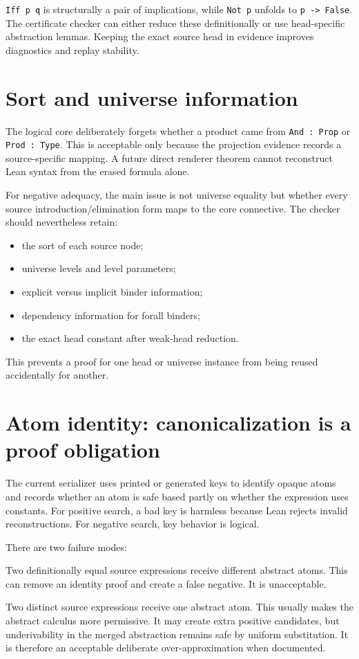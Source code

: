 \documentclass[11pt,letterpaper,openany]{report}
\theoremstyle{definition}
\theoremstyle{remark}
\newcommand{\code}[1]{\texttt{#1}}
\begin{document}
\code{Iff p q} is structurally a pair of implications, while \code{Not p} unfolds to \code{p -> False}. The certificate checker can either reduce these definitionally or use head-specific abstraction lemmas. Keeping the exact source head in evidence improves diagnostics and replay stability.

\section{Sort and universe information}
\label{sec:sorts}

The logical core deliberately forgets whether a product came from \code{And : Prop} or \code{Prod : Type}. This is acceptable only because the projection evidence records a source-specific mapping. A future direct renderer theorem cannot reconstruct Lean syntax from the erased formula alone.

For negative adequacy, the main issue is not universe equality but whether every source introduction/elimination form maps to the core connective. The checker should nevertheless retain:

\begin{itemize}
\item the sort of each source node;
\item universe levels and level parameters;
\item explicit versus implicit binder information;
\item dependency information for forall binders;
\item the exact head constant after weak-head reduction.
\end{itemize}

This prevents a proof for one head or universe instance from being reused accidentally for another.

\section{Atom identity: canonicalization is a proof obligation}
\label{sec:atoms}

The current serializer uses printed or generated keys to identify opaque atoms and records whether an atom is safe based partly on whether the expression uses constants. For positive search, a bad key is harmless because Lean rejects invalid reconstructions. For negative search, key behavior is logical.

There are two failure modes:

\begin{description}[style=nextline]
\item[False splitting]
Two definitionally equal source expressions receive different abstract atoms. This can remove an identity proof and create a false negative. It is unacceptable.
\item[False merging]
Two distinct source expressions receive one abstract atom. This usually makes the abstract calculus more permissive. It may create extra positive candidates, but underivability in the merged abstraction remains safe by uniform substitution. It is therefore an acceptable deliberate over-approximation when documented.
\end{description}
\end{document}
